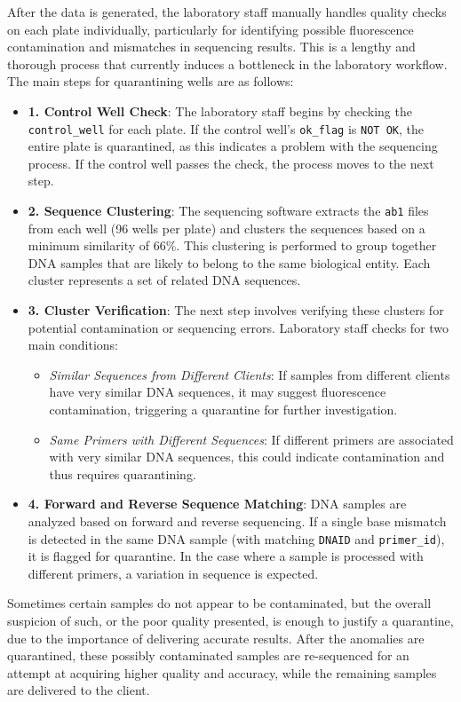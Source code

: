 After the data is generated, the laboratory staff manually handles quality checks on each plate individually, particularly for identifying possible fluorescence contamination and mismatches in sequencing results. This is a lengthy and thorough process that currently induces a bottleneck in the laboratory workflow. The main steps for quarantining wells are as follows:

\begin{itemize}
  \item \textbf{1. Control Well Check}: The laboratory staff begins by checking the \texttt{control\_well} for each plate. If the control well's \texttt{ok\_flag} is \texttt{NOT OK}, the entire plate is quarantined, as this indicates a problem with the sequencing process. If the control well passes the check, the process moves to the next step.
  \item \textbf{2. Sequence Clustering}: The sequencing software extracts the \texttt{ab1} files from each well (96 wells per plate) and clusters the sequences based on a minimum similarity of 66\%. This clustering is performed to group together DNA samples that are likely to belong to the same biological entity. Each cluster represents a set of related DNA sequences.
  \item \textbf{3. Cluster Verification}: The next step involves verifying these clusters for potential contamination or sequencing errors. Laboratory staff checks for two main conditions:
    \begin{itemize}
      \item \textit{Similar Sequences from Different Clients}: If samples from different clients have very similar DNA sequences, it may suggest fluorescence contamination, triggering a quarantine for further investigation.
      \item \textit{Same Primers with Different Sequences}: If different primers are associated with very similar DNA sequences, this could indicate contamination and thus requires quarantining.
    \end{itemize}
  \item \textbf{4. Forward and Reverse Sequence Matching}: DNA samples are analyzed based on forward and reverse sequencing. If a single base mismatch is detected in the same DNA sample (with matching \texttt{DNAID} and \texttt{primer\_id}), it is flagged for quarantine. In the case where a sample is processed with different primers, a variation in sequence is expected.
\end{itemize}
Sometimes certain samples do not appear to be contaminated, but the overall suspicion of such, or the poor quality presented, is enough to justify a quarantine, due to the importance of delivering accurate results.
After the anomalies are quarantined, these possibly contaminated samples are re-sequenced for an attempt at acquiring higher quality and accuracy, while the remaining samples are delivered to the client.

